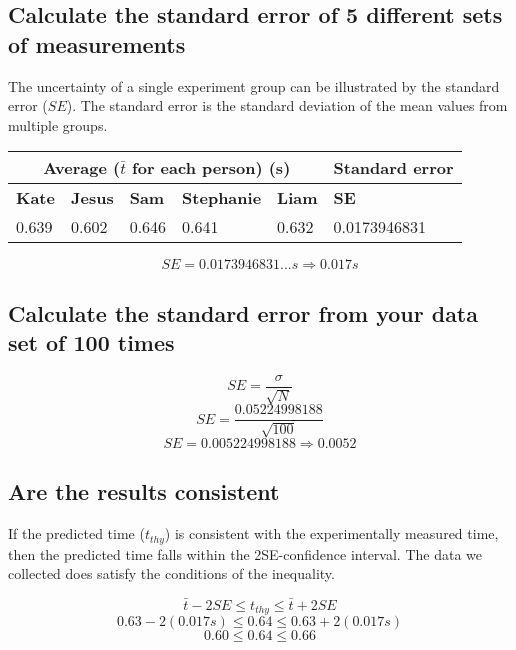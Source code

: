 \documentclass[11pt, letterpaper, includehead]{article}
\begin{document}
\subsection{Calculate the standard error of 5 different sets of measurements} %
The uncertainty of a single experiment group can be illustrated by the standard
error ($SE$). The standard error is the standard deviation of the mean values
from multiple groups.

\begin{center}
  \begin{tabular}{|   m{2cm}  |  m{2cm}  |  m{2cm}  |  m{2cm}  |  m{2cm}  |  m{2.5cm}  | }
    \hline
    \multicolumn{5}{|c|}{\textbf{Average ($\bar{t}$ for each person) (s)}} & \multicolumn{1}{c|}{\textbf{Standard error}}\\
    
    \hline
    \textbf{Kate} & \textbf{Jesus} & \textbf{Sam} & \textbf{Stephanie} & \textbf{Liam} & \textbf{SE}  \\
    \hline
    0.639         & 0.602          & 0.646        & 0.641              & 0.632         & 0.0173946831 \\  %
    \hline
  \end{tabular}
\end{center}

$$SE = 0.0173946831...s \Rightarrow \boxed{0.017s}$$

\subsection{Calculate the standard error from your data set of 100 times} %
$$SE = \frac{\sigma}{\sqrt{N}}$$
$$SE = \frac{0.05224998188}{\sqrt{100}}$$
$$SE = 0.005224998188 \Rightarrow \boxed{0.0052}$$

\subsection{Are the results consistent}
If the predicted time ($t_{thy}$) is consistent with the experimentally 
measured time, then the predicted time falls within the 2SE-confidence interval.
The data we collected does satisfy the conditions of the inequality.

$$\bar{t} - 2SE \leq t_{thy} \leq \bar{t} + 2SE$$
$$0.63 - 2(0.017s) \leq 0.64 \leq 0.63 + 2(0.017s)$$
$$0.60 \leq 0.64 \leq 0.66$$
\end{document}
